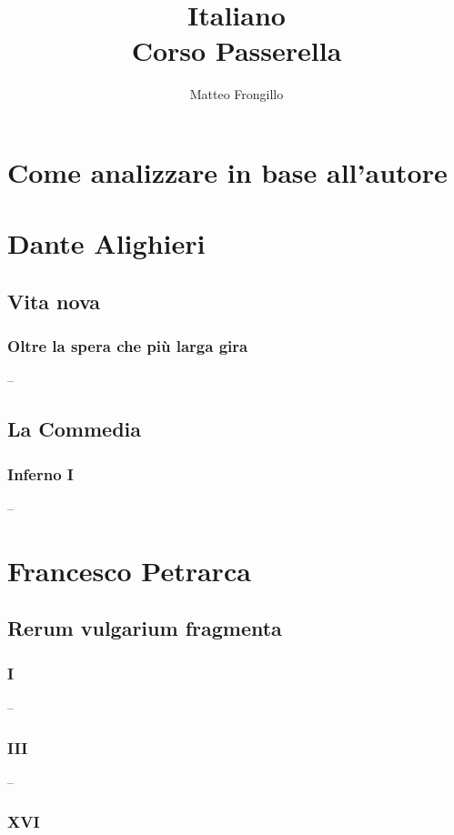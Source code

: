 \documentclass{article}
\title{\textbf{Italiano\\Corso Passerella}}
\author{Matteo Frongillo}
\begin{document}
\maketitle
\tableofcontents

\newpage
\section{Come analizzare in base all'autore}


\newpage
\section{Dante Alighieri}
\subsection{Vita nova}
\subsubsection{Oltre la spera che più larga gira}

--

\newpage
\subsection{La Commedia}
\subsubsection{Inferno I}

--

\newpage
\section{Francesco Petrarca}
\subsection{Rerum vulgarium fragmenta}
\subsubsection{I}

--

\newpage
\subsubsection{III}

--

\newpage
\subsubsection{XVI}
\end{document}
